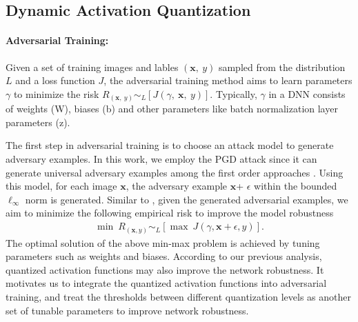 \documentclass{article}
\def \x{\mathbf{x}}
\begin{document}
\subsection{Dynamic Activation Quantization}

\paragraph{Adversarial Training:}


Given a set of training images and lables $(\x,\ y)$ sampled from the distribution $L$ and a loss function $J$, the adversarial training method aims to learn parameters $\gamma$ to minimize the risk $R_{(\x,\ y)}\sim_L[J(\gamma,\ \x,\ y)]$. Typically,  $\gamma$ in a DNN consists of weights (W), biases (b) and other parameters like batch normalization layer parameters (z).

The first step in adversarial training is to choose an attack model to generate adversary examples. In this work, we employ the PGD attack since it can generate universal adversary examples among the first order approaches \cite{madry2017towards}. Using this model, for each image $\x$, the adversary example $\x$+ $\epsilon$ within the bounded $\ell_\infty$ norm is generated. %
Similar to \cite{kurakin2016adversarial, madry2017towards,wald1945statistical}, given the generated adversarial examples, we aim to minimize the following empirical risk to improve the model robustness
\begin{eqnarray}
\label{eqn:5}
{\min}\ R_{(\x,y)}\sim_L[\max \ J(\gamma,\x+\epsilon,y)].
\end{eqnarray}
The optimal solution of the above min-max problem is achieved by tuning parameters such as weights and biases. According to our previous analysis, quantized activation functions may also improve the network robustness. It motivates us to integrate the quantized activation functions into adversarial training, and treat the thresholds between different quantization levels as another set of tunable parameters to improve network robustness.
\end{document}
